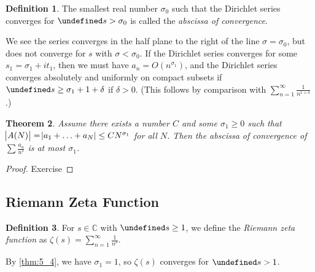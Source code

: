 \documentclass[11pt]{article}
\theoremstyle{definition}
\newtheorem{definition}{Definition}[section]
\theoremstyle{plain}
\newtheorem{theorem}[definition]{Theorem}
\theoremstyle{remark}
\let\Re\undefined
\DeclareMathOperator{\Re}{Re}
\newcommand{\CC}{\mathbb{C}}
\begin{document}
\begin{definition}\label{def:5_3}
    The smallest real number $\sigma_0$ such that the Dirichlet series converges for $\Re s > \sigma_0$ is called the \emph{abscissa of convergence}.
\end{definition}

We see the series converges in the half plane to the right of the line $\sigma = \sigma_0$, but does not converge for $s$ with $\sigma < \sigma_0$. If the Dirichlet series converges for some $s_1 = \sigma_1 + i t_1$, then we must have $a_n = O(n^{\sigma_1})$, and the Dirichlet series converges absolutely and uniformly on compact subsets if $\Re s \ge \sigma_1 + 1 + \delta$ if $\delta > 0$. (This follows by comparison with $\sum_{n=1}^{\infty} \frac{1}{n^{1+\delta}}$.)

\begin{theorem}\label{thm:5_4}
    Assume there exists a number $C$ and some $\sigma_1 \ge 0$ such that $\abs{A(N)} = \abs{a_1 + \ldots + a_N} \le C N^{\sigma_1}$ for all $N$. Then the abscissa of convergence of $\sum \frac{a_n}{n^s}$ is at most $\sigma_1$.
\end{theorem}
\begin{proof}
    Exercise
\end{proof}

\subsection{Riemann Zeta Function}

\begin{definition}\label{def:5_5}
    For $s \in \CC$ with $\Re s \ge 1$, we define the \emph{Riemann zeta function} as $\zeta(s) = \sum_{n=1}^\infty \frac{1}{n^s}$.
\end{definition}

\noindent By \autoref{thm:5_4}, we have $\sigma_1 = 1$, so $\zeta(s)$ converges for $\Re s > 1$.
\end{document}
